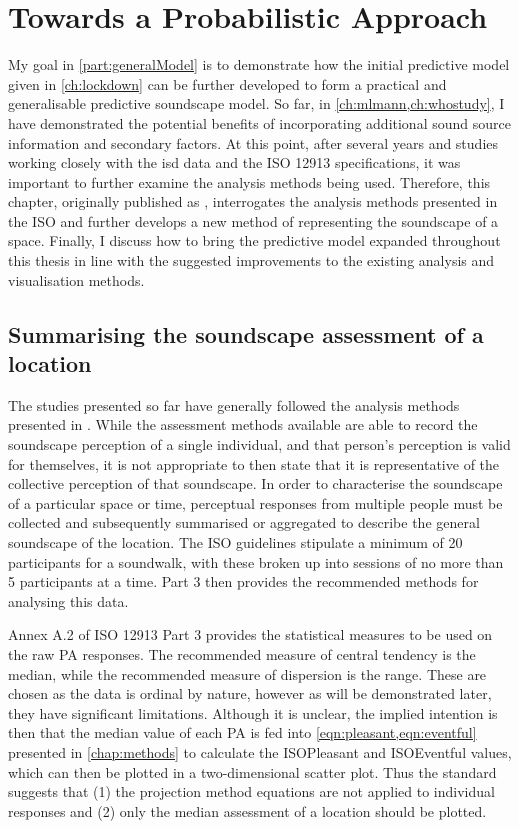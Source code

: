 \chapter{Towards a Probabilistic Approach}
\label{ch:ProbabilisticPOC}

My goal in \cref{part:generalModel} is to demonstrate how the initial predictive model given in \cref{ch:lockdown} can be further developed to form a practical and generalisable predictive soundscape model. So far, in \cref{ch:mlmann,ch:whostudy}, I have demonstrated the potential benefits of incorporating additional sound source information and secondary factors. At this point, after several years and studies working closely with the \gls{isd} data and the ISO 12913 specifications, it was important to further examine the analysis methods being used. Therefore, this chapter, originally published as \citet{Mitchell2022How}, interrogates the analysis methods presented in the ISO and further develops a new method of representing the soundscape of a space. Finally, I discuss how to bring the predictive model expanded throughout this thesis in line with the suggested improvements to the existing analysis and visualisation methods. 

\section{Summarising the soundscape assessment of a location}
The studies presented so far have generally followed the analysis methods presented in \citet{ISO12913Part3}. While the assessment methods available are able to record the soundscape perception of a single individual, and that person's perception is valid for themselves, it is not appropriate to then state that it is representative of the collective perception of that soundscape. In order to characterise the soundscape of a particular space or time, perceptual responses from multiple people must be collected and subsequently summarised or aggregated to describe the general soundscape of the location. The ISO guidelines stipulate a minimum of 20 participants for a soundwalk, with these broken up into sessions of no more than 5 participants at a time. Part 3 then provides the recommended methods for analysing this data.

Annex A.2 of ISO 12913 Part 3 provides the statistical measures to be used on the raw PA responses. The recommended measure of central tendency is the median, while the recommended measure of dispersion is the range. These are chosen as the data is ordinal by nature, however as will be demonstrated later, they have significant limitations. Although it is unclear, the implied intention is then that the median value of each PA is fed into \cref{eqn:pleasant,eqn:eventful} presented in \cref{chap:methods} to calculate the ISOPleasant and ISOEventful values, which can then be plotted in a two-dimensional scatter plot. Thus the standard suggests that (1) the projection method equations are not applied to individual responses and (2) only the median assessment of a location should be plotted.

